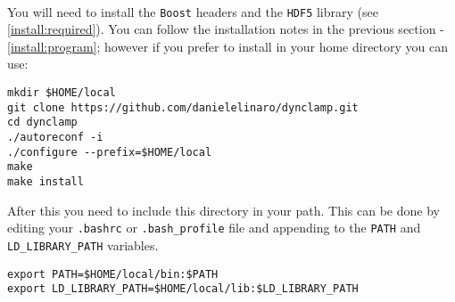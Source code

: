 \paragraph{}
You will need to install the \texttt{Boost} headers and the \texttt{HDF5} library (see \ref{install:required}). 
You can follow the installation notes in the previous section - \ref{install:program}; however if you prefer to install in your home directory you can use:
\begin{lstlisting}
mkdir $HOME/local
git clone https://github.com/danielelinaro/dynclamp.git
cd dynclamp
./autoreconf -i
./configure --prefix=$HOME/local
make
make install
\end{lstlisting}
After this you need to include this directory in your path. This can be done by editing your \texttt{.bashrc} or \texttt{.bash\_profile} file and appending to the \texttt{PATH} and \texttt{LD\_LIBRARY\_PATH} variables.
\begin{lstlisting}
export PATH=$HOME/local/bin:$PATH
export LD_LIBRARY_PATH=$HOME/local/lib:$LD_LIBRARY_PATH
\end{lstlisting}


